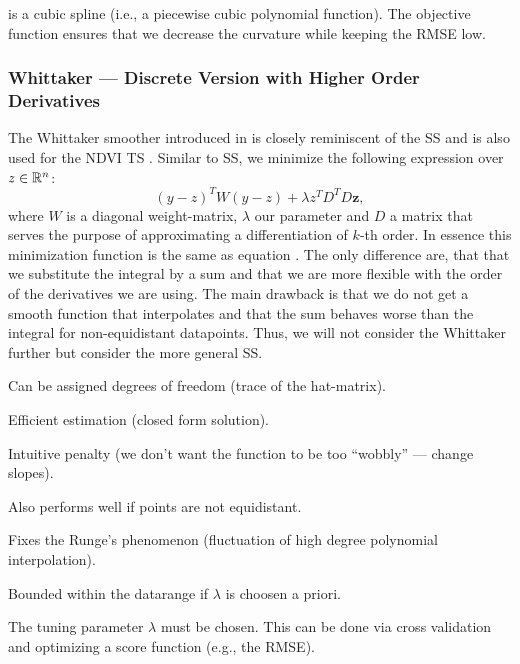 		is a %
		cubic spline (i.e., a piecewise cubic polynomial function).
		The objective function ensures that we decrease the curvature while keeping the RMSE low.

		\subsubsection{Whittaker --- Discrete Version with Higher Order Derivatives}
			The Whittaker smoother introduced in \cite{eilersPerfectSmoother2003} is closely reminiscent of the SS and is also used for the NDVI TS \citep{atzbergerTimeSeriesMonitoring2011}. Similar to SS, we minimize the following expression over $z\in \mathbb{R}^n$:
			$$
			({y}-{z})^{{T}} {W}({y}-{z})+\lambda {z}^{{T}} {D}^{{T}} {D} \mathbf{z},
			$$
			where $W$ is a diagonal weight-matrix, $\lambda$ our parameter and $D$ a matrix that serves the purpose of approximating a differentiation of $k$-th order. In essence this minimization function is the same as equation . The only difference are, that that we substitute the integral by a sum and that we are more flexible with the order of the derivatives we are using. The main drawback is that we do not get a smooth function that interpolates and that the sum behaves worse than the integral for non-equidistant datapoints. Thus, we will not consider the Whittaker further but consider the more general SS. 

		\begin{my_pros_cons_table}{
				\item Can be assigned degrees of freedom (trace of the hat-matrix).
				\item Efficient estimation (closed form solution).
				\item Intuitive penalty (we don't want the function to be too ``wobbly'' --- change slopes).
				\item Also performs well if points are not equidistant.
				\item Fixes the Runge's phenomenon (fluctuation of high degree polynomial interpolation).
				\item Bounded within the datarange if $\lambda$ is choosen a priori.
			}{
				\item The tuning parameter $\lambda$ must be chosen. This can be done via cross validation and optimizing a score function (e.g., the RMSE). 
			}
		\end{my_pros_cons_table}


